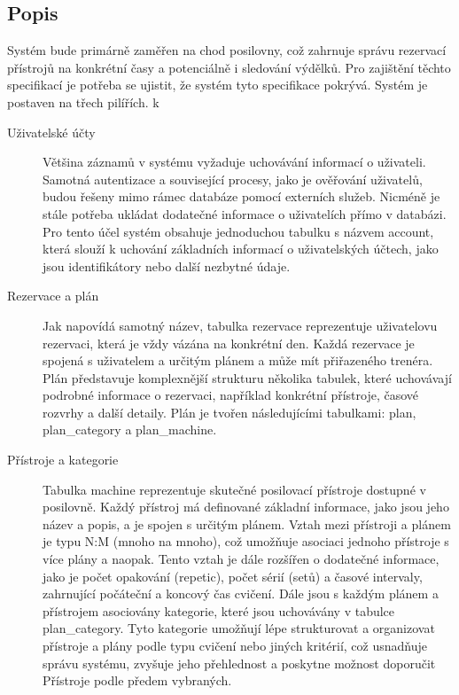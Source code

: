 \subsection{Popis}
Systém bude primárně zaměřen na chod posilovny, což zahrnuje správu rezervací přístrojů na konkrétní časy a potenciálně i sledování výdělků. Pro zajištění těchto specifikací je potřeba se ujistit, že systém tyto specifikace pokrývá. Systém je postaven na třech pilířích.
k
\begin{description}
    \item[Uživatelské účty] Většina záznamů v systému vyžaduje uchovávání informací o uživateli. Samotná autentizace a související procesy, jako je ověřování uživatelů, budou řešeny mimo rámec databáze pomocí externích služeb. Nicméně je stále potřeba ukládat dodatečné informace o uživatelích přímo v databázi. Pro tento účel systém obsahuje jednoduchou tabulku s názvem account, která slouží k uchování základních informací o uživatelských účtech, jako jsou identifikátory nebo další nezbytné údaje.
    \item[Rezervace a plán] Jak napovídá samotný název, tabulka rezervace reprezentuje uživatelovu rezervaci, která je vždy vázána na konkrétní den. Každá rezervace je spojená s uživatelem a určitým plánem a může mít přiřazeného trenéra. Plán představuje komplexnější strukturu několika tabulek, které uchovávají podrobné informace o rezervaci, například konkrétní přístroje, časové rozvrhy a další detaily. Plán je tvořen následujícími tabulkami: plan, plan\_category a plan\_machine.
    \item[Přístroje a kategorie] Tabulka machine reprezentuje skutečné posilovací přístroje dostupné v posilovně. Každý přístroj má definované základní informace, jako jsou jeho název a popis, a je spojen s určitým plánem. Vztah mezi přístroji a plánem je typu N:M (mnoho na mnoho), což umožňuje asociaci jednoho přístroje s více plány a naopak. Tento vztah je dále rozšířen o dodatečné informace, jako je počet opakování (repetic), počet sérií (setů) a časové intervaly, zahrnující počáteční a koncový čas cvičení. Dále jsou s každým plánem a přístrojem asociovány kategorie, které jsou uchovávány v tabulce plan\_category. Tyto kategorie umožňují lépe strukturovat a organizovat přístroje a plány podle typu cvičení nebo jiných kritérií, což usnadňuje správu systému, zvyšuje jeho přehlednost a poskytne možnost doporučit Přístroje podle předem vybraných.
\end{description}

